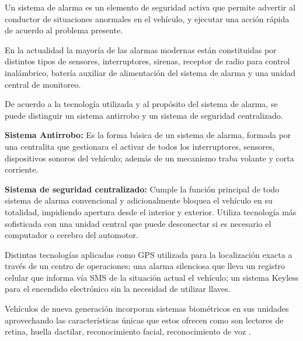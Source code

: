 Un sistema de alarma es un elemento de seguridad activa que permite advertir al conductor de situaciones anormales en el vehículo, y ejecutar una acción rápida de acuerdo al problema presente. 

En la actualidad la mayoría de las alarmas modernas están constituidas por distintos tipos de sensores, interruptores, sirenas, receptor de radio para control inalámbrico, batería auxiliar de alimentación del sistema de alarma y una unidad central de monitoreo.

De acuerdo a la tecnología utilizada y al propósito del sistema de alarma, se puede distinguir un sistema antirrobo y un sistema de seguridad centralizado.

\textbf{Sistema Antirrobo:}
Es la forma básica de un sistema de alarma, formada por una centralita que gestionara el activar de todos los interruptores, sensores, dispositivos sonoros del vehículo; además de un mecanismo traba volante y corta corriente.

\textbf{Sistema de seguridad centralizado:}
Cumple la función principal de todo sistema de alarma convencional y adicionalmente bloquea el vehículo en su totalidad, impidiendo apertura desde el interior y exterior. Utiliza tecnología más sofisticada con una unidad central que puede desconectar si es necesario el computador o cerebro del automotor. 

Distintas tecnologías aplicadas como GPS utilizada para la localización exacta a través de un centro de operaciones; una alarma silenciosa que lleva un registro celular que informa vía SMS de la situación actual el vehículo; un sistema Keyless para el encendido electrónico sin la necesidad de utilizar llaves. 

Vehículos de nueva generación incorporan sistemas biométricos en sus unidades aprovechando las características únicas que estos ofrecen como son lectores de retina, huella dactilar, reconocimiento facial, reconocimiento de voz
 \cite{MT-16}.


